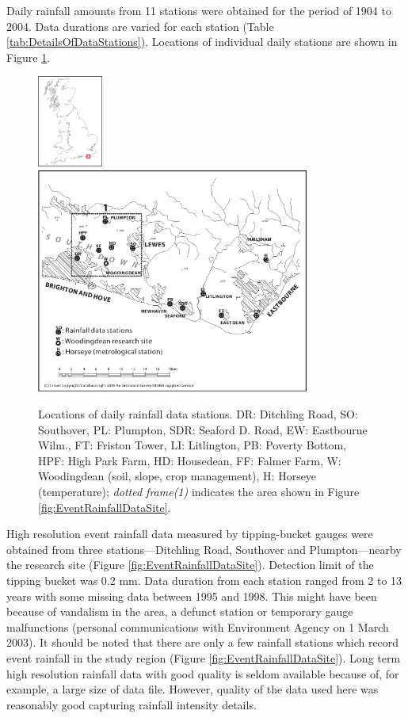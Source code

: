 Daily rainfall amounts from 11 stations were obtained for the period of 1904 to
2004. Data durations are varied for each station (Table
\ref{tab:DetailsOfDataStations}). Locations of individual daily stations are
shown in Figure \ref{fig:DailyRainfallDataSite}.

\begin{figure}[phtb]
  \includegraphics[width=0.19\textwidth]{./img/ukoutline}
  \includegraphics[width=0.8\textwidth]{./img/dailydatasite}
  \caption[Locations of daily rainfall data stations]{Locations of daily
rainfall data stations. DR: Ditchling Road, SO: Southover, PL: Plumpton, SDR:
Seaford D. Road, EW: Eastbourne Wilm., FT: Friston Tower, LI: Litlington, PB:
Poverty Bottom, HPF: High Park Farm, HD: Housedean, FF: Falmer Farm, W:
Woodingdean (soil, slope, crop management), H: Horseye (temperature);
\emph{dotted frame(1)} indicates the area shown in Figure
\ref{fig:EventRainfallDataSite}.}
  \label{fig:DailyRainfallDataSite}
\end{figure}

High resolution event rainfall data measured by tipping-bucket gauges were
obtained from three stations---Ditchling Road, Southover and Plumpton---nearby
the research site (Figure \ref{fig:EventRainfallDataSite}). Detection limit of
the tipping bucket was 0.2 mm. Data duration from each station ranged from 2 to
13 years with some missing data between 1995 and 1998. This might have been
because of vandalism in the area, a defunct station or temporary gauge
malfunctions (personal communications with Environment Agency on 1 March 2003).
It should be noted that there are only a few rainfall stations which record
event rainfall in the study region (Figure \ref{fig:EventRainfallDataSite}).
Long term high resolution rainfall data with good quality is seldom available
because of, for example, a large size of data file. However, quality of the data
used here was reasonably good capturing rainfall intensity details.

